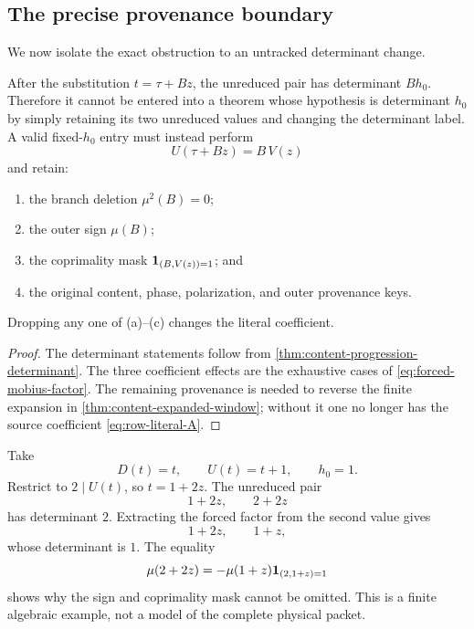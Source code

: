 \subsection{The precise provenance boundary}

We now isolate the exact obstruction to an untracked determinant
change.

\begin{theorem}
\label{thm:no-silent-relabeling}
After the substitution \(t=\tau+Bz\), the unreduced pair has
determinant \(Bh_0\).  Therefore it cannot be entered into a theorem
whose hypothesis is determinant \(h_0\) by simply retaining its two
unreduced values and changing the determinant label.  A valid
fixed-\(h_0\) entry must instead perform
\[
 U(\tau+Bz)=B\,V(z)
\]
and retain:
\begin{enumerate}[label=(\alph*),leftmargin=2.2em]
\item the branch deletion \(\mu^2(B)=0\);
\item the outer sign \(\mu(B)\);
\item the coprimality mask \(\mathbf 1_{(B,V(z))=1}\); and
\item the original content, phase, polarization, and outer
provenance keys.
\end{enumerate}
Dropping any one of (a)--(c) changes the literal coefficient.
\end{theorem}

\begin{proof}
The determinant statements follow from
\cref{thm:content-progression-determinant}.  The three coefficient
effects are the exhaustive cases of
\eqref{eq:forced-mobius-factor}.  The remaining provenance is needed
to reverse the finite expansion in
\cref{thm:content-expanded-window}; without it one no longer has the
source coefficient \eqref{eq:row-literal-A}.
\end{proof}

\begin{example}
\label{ex:two-determinants}
Take
\[
 D(t)=t,\qquad U(t)=t+1,\qquad h_0=1.
\]
Restrict to \(2\mid U(t)\), so \(t=1+2z\).  The unreduced pair
\[
 1+2z,\qquad2+2z
\]
has determinant \(2\).  Extracting the forced factor from the second
value gives
\[
 1+2z,\qquad1+z,
\]
whose determinant is \(1\).  The equality
\[
 \mu(2+2z)
 =
 -\mu(1+z)\mathbf 1_{(2,1+z)=1}
\]
shows why the sign and coprimality mask cannot be omitted.  This is a
finite algebraic example, not a model of the complete physical
packet.
\end{example}
